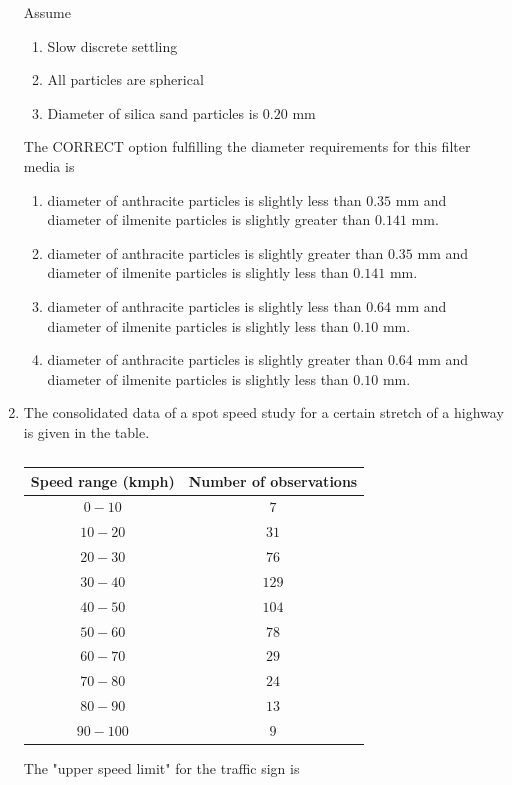 \documentclass[journal,12pt,onecolumn]{article}
\theoremstyle{remark}
\begin{document}
\begin{enumerate}
    Assume
    \begin{enumerate}
        \item[\brak{\text{i}}] Slow discrete settling 
        \item[\brak{\text{ii}}] All particles are spherical
        \item[\brak{\text{iii}}] Diameter of silica sand particles is $0.20$ mm
    \end{enumerate}
    The CORRECT option fulfilling the diameter requirements for this filter media is
    
    \hfill{}
    \begin{enumerate}
        \item diameter of anthracite particles is slightly less than $0.35$ mm and diameter of ilmenite
        particles is slightly greater than $0.141$ mm.
        \item diameter of anthracite particles is slightly greater than $0.35$ mm and diameter of
        ilmenite particles is slightly less than $0.141$ mm.
        \item diameter of anthracite particles is slightly less than $0.64$ mm and diameter of ilmenite
        particles is slightly less than $0.10$ mm.
        \item diameter of anthracite particles is slightly greater than $0.64$ mm and diameter of
        ilmenite particles is slightly less than $0.10$ mm.
    \end{enumerate}

    \item The consolidated data of a spot speed study for a certain stretch of a highway is given
    in the table.
    \begin{table}[H]
        \centering
        \begin{tabular}{|c|c|}
        \hline
        \textbf{Speed range (kmph)} & \textbf{Number of observations} \\ \hline
        $0-10$ & $7$ \\
        $10-20$ & $31$ \\
        $20-30$ & $76$ \\
        $30-40$ & $129$ \\
        $40-50$ & $104$ \\
        $50-60$ & $78$ \\
        $60-70$ & $29$ \\
        $70-80$ & $24$ \\
        $80-90$ & $13$ \\
        $90-100$ & $9$ \\ \hline
        \end{tabular}
        \caption{}
        \label{tab:q43}
    \end{table}
    The "upper speed limit"  for the traffic sign is
    

\end{enumerate}
\end{document}

